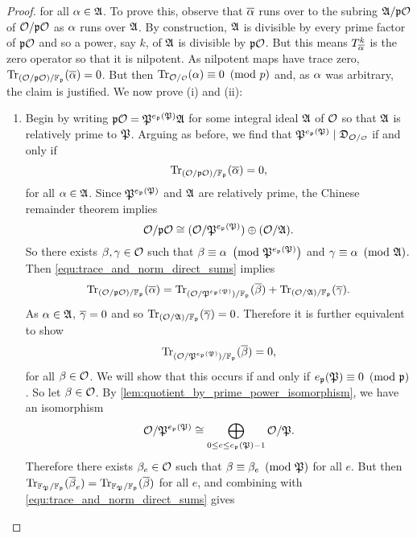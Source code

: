 \begin{proof}
      for all $\alpha \in \mathfrak{A}$. To prove this, observe that $\overline{\alpha}$ runs over to the subring $\mathfrak{A}/\mathfrak{p}\mathcal{O}$ of $\mathcal{O}/\mathfrak{p}\mathcal{O}$ as $\alpha$ runs over $\mathfrak{A}$. By construction, $\mathfrak{A}$ is divisible by every prime factor of $\mathfrak{p}\mathcal{O}$ and so a power, say $k$, of $\mathfrak{A}$ is divisible by $\mathfrak{p}\mathcal{O}$. But this means $T_{\overline{\alpha}}^{k}$ is the zero operator so that it is nilpotent. As nilpotent maps have trace zero, $\operatorname{\mathrm{Tr}}_{(\mathcal{O}/\mathfrak{p}\mathcal{O})/\mathbb{F}_{\mathfrak{p}}}(\overline{\alpha}) = 0$. But then $\Trace_{\mc{O}/\smc{O}}(\a) \equiv 0 \tmod{p}$ and, as $\alpha$ was arbitrary, the claim is justified. We now prove (i) and (ii):
      \begin{enumerate}[label=(\roman*)]
        \item Begin by writing $\mathfrak{p}\mathcal{O} = \mathfrak{P}^{e_{\mathfrak{p}}(\mathfrak{P})}\mathfrak{A}$ for some integral ideal $\mathfrak{A}$ of $\mathcal{O}$ so that $\mathfrak{A}$ is relatively prime to $\mathfrak{P}$. Arguing as before, we find that $\mf{P}^{e_{\mf{p}}(\mf{P})} \mid \mf{D}_{\mc{O}/\smc{O}}$ if and only if
        \[
          \operatorname{\mathrm{Tr}}_{(\mathcal{O}/\mathfrak{p}\mathcal{O})/\mathbb{F}_{\mathfrak{p}}}(\overline{\alpha}) = 0,
        \]
        for all $\alpha \in \mathfrak{A}$. Since $\mathfrak{P}^{e_{\mathfrak{p}}(\mathfrak{P})}$ and $\mathfrak{A}$ are relatively prime, the Chinese remainder theorem implies
        \[
          \mathcal{O}/\mathfrak{p}\mathcal{O} \cong (\mathcal{O}/\mathfrak{P}^{e_{\mathfrak{p}}(\mathfrak{P})}) \oplus (\mathcal{O}/\mathfrak{A}).
        \]
        So there exists $\beta,\gamma \in \mathcal{O}$ such that $\beta \equiv \alpha \ \left(\text{mod }\mathfrak{P}^{e_{\mathfrak{p}}(\mathfrak{P})}\right)$ and $\gamma \equiv \alpha \ \left(\text{mod }\mathfrak{A}\right)$. Then \cref{equ:trace_and_norm_direct_sums} implies
        \[
          \operatorname{\mathrm{Tr}}_{(\mathcal{O}/\mathfrak{p}\mathcal{O})/\mathbb{F}_{\mathfrak{p}}}(\overline{\alpha}) = \operatorname{\mathrm{Tr}}_{(\mathcal{O}/\mathfrak{P}^{e_{\mathfrak{p}}(\mathfrak{P})})/\mathbb{F}_{\mathfrak{p}}}(\overline{\beta})+\operatorname{\mathrm{Tr}}_{(\mathcal{O}/\mathfrak{A})/\mathbb{F}_{\mathfrak{p}}}(\overline{\gamma}).
        \]
        As $\alpha \in \mathfrak{A}$, $\overline{\gamma} = 0$ and so $\operatorname{\mathrm{Tr}}_{(\mathcal{O}/\mathfrak{A})/\mathbb{F}_{\mathfrak{p}}}(\overline{\gamma}) = 0$. Therefore it is further equivalent to show
        \[
          \operatorname{\mathrm{Tr}}_{(\mathcal{O}/\mathfrak{P}^{e_{\mathfrak{p}}(\mathfrak{P})})/\mathbb{F}_{\mathfrak{p}}}(\overline{\beta}) = 0,
        \]
        for all $\beta \in \mathcal{O}$. We will show that this occurs if and only if $e_{\mathfrak{p}}(\mathfrak{P}) \equiv 0 \ \left(\text{mod }\mathfrak{p}\right)$. So let $\beta \in \mathcal{O}$. By \cref{lem:quotient_by_prime_power_isomorphism}, we have an isomorphism
        \[
          \mathcal{O}/\mathfrak{P}^{e_{\mathfrak{p}}(\mathfrak{P})} \cong \bigoplus_{0 \le e \le e_{\mathfrak{p}}(\mathfrak{P})-1}\mathcal{O}/\mathfrak{P}.
        \]
        Therefore there exists $\beta_{e} \in \mathcal{O}$ such that $\beta \equiv \beta_{e} \ \left(\text{mod }\mathfrak{P}\right)$ for all $e$. But then $\operatorname{\mathrm{Tr}}_{\mathbb{F}_{\mathfrak{P}}/\mathbb{F}_{\mathfrak{p}}}(\overline{\beta}_{e}) = \operatorname{\mathrm{Tr}}_{\mathbb{F}_{\mathfrak{P}}/\mathbb{F}_{\mathfrak{p}}}(\overline{\beta})$ for all $e$, and combining with \cref{equ:trace_and_norm_direct_sums} gives

\end{enumerate}
\end{proof}
